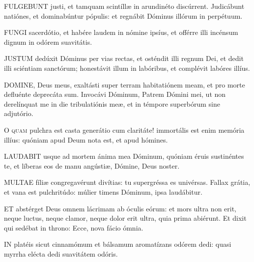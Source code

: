 
\lettrine[lines=2]{F}{ULGEBUNT} justi, et tamquam scintíllæ in arundinéto discúrrent. Judicábunt natiónes, et dominabúntur pópulis: et regnábit Dóminus illórum in perpétuum.


\lettrine[lines=2]{F}{UNGI} sacerdótio, et habére laudem in nómine ipsíus, et offérre illi incénsum dignum in odórem suavitátis.


\lettrine[lines=2]{J}{USTUM} dedúxit Dóminus per vias rectas, et osténdit illi regnum Dei, et dedit illi sciéntiam sanctórum; honestávit illum in labóribus, et complévit labóres illíus.


\lettrine[lines=2]{D}{OMINE}, Deus meus, exaltásti super terram habitatiónem meam, et pro morte defluénte deprecáta sum. Invocávi Dóminum, Patrem Dómini mei, ut non derelínquat me in die tribulatiónis meæ, et in témpore superbórum sine adjutório.


\lettrine[lines=2]{O}{} \textsc{quam} pulchra est casta generátio cum claritáte! immortális est enim memória illíus: quóniam apud Deum nota est, et apud hómines.


\lettrine[lines=2]{L}{AUDABIT} usque ad mortem ánima mea Dóminum, quóniam éruis sustinéntes te, et líberas eos de manu angústiæ, Dómine, Deus noster.


\lettrine[lines=2]{M}{ULTAE} fíliæ congregavérunt divítias: tu supergréssa es univérsas. Fallax grátia, et vana est pulchritúdo: múlier timens Dóminum, ipsa laudábitur.


\lettrine[lines=2]{E}{T} abstérget Deus omnem lácrimam ab óculis eórum: et mors ultra non erit, neque luctus, neque clamor, neque dolor erit ultra, quia prima abiérunt. Et dixit qui sedébat in throno: Ecce, nova fácio ómnia.


\lettrine[lines=2]{I}{N} platéis sicut cinnamómum et bálsamum aromatízans odórem dedi: quasi myrrha elécta dedi suavitátem odóris.

